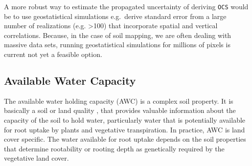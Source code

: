 \documentclass[11pt]{krantz}
\newenvironment{Shaded}{\begin{snugshade}}{\end{snugshade}}
\newcommand{\CommentTok}[1]{\textcolor[rgb]{0.37,0.37,0.37}{\textit{#1}}}
\newcommand{\DecValTok}[1]{\textcolor[rgb]{0.06,0.06,0.06}{#1}}
\newcommand{\FloatTok}[1]{\textcolor[rgb]{0.06,0.06,0.06}{#1}}
\newcommand{\KeywordTok}[1]{\textcolor[rgb]{0.27,0.27,0.27}{\textbf{#1}}}
\newcommand{\NormalTok}[1]{#1}
\newcommand{\OperatorTok}[1]{\textcolor[rgb]{0.43,0.43,0.43}{\textbf{#1}}}
\newcommand{\StringTok}[1]{\textcolor[rgb]{0.5,0.5,0.5}{#1}}
\theoremstyle{definition}
\theoremstyle{definition}
\theoremstyle{definition}
\theoremstyle{remark}
\begin{document}
\begin{Shaded}
\end{Shaded}

A more robust way to estimate the propagated uncertainty of deriving
\texttt{OCS} would be to use geostatistical simulations e.g.~derive
standard error from a large number of realizations (e.g.
\textgreater{}100) that incorporate spatial and vertical correlations.
Because, in the case of soil mapping, we are often dealing with massive
data sets, running geostatistical simulations for millions of pixels is
current not yet a feasible option.

\hypertarget{available-water-capacity}{%
\subsection{Available Water Capacity}\label{available-water-capacity}}

The available water holding capacity (AWC) is a complex soil property.
It is basically a soil or land quality \citep{food1977framework}, that
provides valuable information about the capacity of the soil to hold
water, particularly water that is potentially available for root uptake
by plants and vegetative transpiration. In practice, AWC is land cover
specific. The water available for root uptake depends on the soil
properties that determine rootability or rooting depth as genetically
required by the vegetative land cover.
\end{document}
